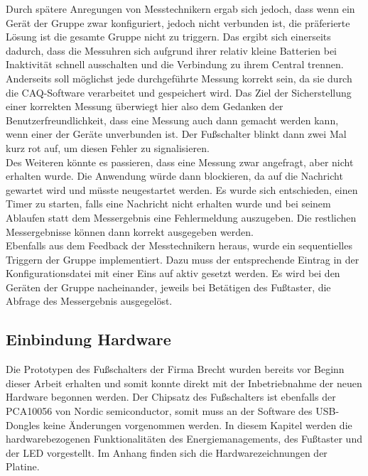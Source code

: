 Durch spätere Anregungen von Messtechnikern ergab sich jedoch, dass wenn ein Gerät der Gruppe zwar konfiguriert, jedoch nicht verbunden ist, die präferierte Lösung ist die gesamte Gruppe nicht zu triggern. Das ergibt sich einerseits dadurch, dass die Messuhren sich aufgrund ihrer relativ kleine Batterien bei Inaktivität schnell ausschalten und die Verbindung zu ihrem Central trennen. Anderseits soll möglichst jede durchgeführte Messung korrekt sein, da sie durch die \ac{CAQ}-Software verarbeitet und gespeichert wird. Das Ziel der Sicherstellung einer korrekten Messung überwiegt hier also dem Gedanken der Benutzerfreundlichkeit, dass eine Messung auch dann gemacht werden kann, wenn einer der Geräte unverbunden ist. Der Fußschalter blinkt dann zwei Mal kurz rot auf, um diesen Fehler zu signalisieren.\\
Des Weiteren könnte es passieren, dass eine Messung zwar angefragt, aber nicht erhalten wurde. Die Anwendung würde dann blockieren, da auf die Nachricht gewartet wird und müsste neugestartet werden. Es wurde sich entschieden, einen Timer zu starten, falls eine Nachricht nicht erhalten wurde und bei seinem Ablaufen statt dem Messergebnis eine Fehlermeldung auszugeben. Die restlichen Messergebnisse können dann korrekt ausgegeben werden.\\
Ebenfalls aus dem Feedback der Messtechnikern heraus, wurde ein sequentielles Triggern der Gruppe implementiert. Dazu muss der entsprechende Eintrag in der Konfigurationsdatei mit einer Eins auf aktiv gesetzt werden. Es wird bei den Geräten der Gruppe nacheinander, jeweils bei Betätigen des Fußtaster, die Abfrage des Messergebnis ausgegelöst.

\subsection{Einbindung Hardware}
Die Prototypen des Fußschalters der Firma Brecht wurden bereits vor Beginn dieser Arbeit erhalten und somit konnte direkt mit der Inbetriebnahme der neuen Hardware begonnen werden. Der Chipsatz des Fußschalters ist ebenfalls der PCA10056 von Nordic semiconductor, somit muss an der Software des \ac{USB}-Dongles keine Änderungen vorgenommen werden. In diesem Kapitel werden die hardwarebezogenen Funktionalitäten des Energiemanagements, des Fußtaster und der \ac{LED} vorgestellt. Im Anhang finden sich die Hardwarezeichnungen der Platine.

